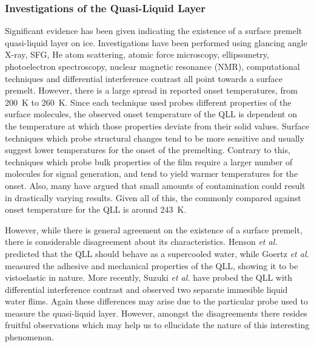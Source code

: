 \subsubsection{Investigations of the Quasi-Liquid Layer}
Significant evidence has been given indicating the existence of a
surface premelt quasi-liquid layer on ice. Investigations have been
performed using glancing angle X-ray\cite{Lied1994, Dosch1995},
SFG\cite{Wei2001}, He atom scattering\cite{Suter2006}, atomic force
microscopy\cite{Goertz2009,Doppenschmidt2000},
ellipsometry\cite{Furukawa1997}, photoelectron
spectroscopy\cite{Bluhm2002}, nuclear magnetic resonance
(NMR)\cite{Dec2009,Dec2012}, computational
techniques\cite{Conde2008,Neshyba2009,Gladich2011,Pfalzgraff2011,Gladich2015,Park2010,Shepherd2012,Limmer2014,Persson2015}
and differential interference
contrast\cite{Sazaki2012,Asakawa2016,Sazaki2013} all point towards a
surface premelt. However, there is a large spread in reported onset
temperatures, from 200~K to 260~K. Since each technique used probes
different properties of the surface molecules, the observed onset
temperature of the QLL is dependent on the temperature at which those
properties deviate from their solid values. Surface techniques which
probe structural changes tend to be more sensitive and usually suggest
lower temperatures for the onset of the premelting. Contrary to this,
techniques which probe bulk properties of the film require a larger
number of molecules for signal generation, and tend to yield warmer
temperatures for the onset. Also, many have argued that small amounts
of contamination could result in drastically varying
results.\cite{Elbaum1993,Wettlaufer1999} Given all of this, the
commonly compared against onset temperature for the QLL is around
243~K.

However, while there is general agreement on the existence of a
surface premelt, there is considerable disagreement about its
characteristics. Henson \textit{et al.} predicted that the QLL should
behave as a supercooled water\cite{Henson2005}, while Goertz
\textit{et al.}  measured the adhesive and mechanical properties of
the QLL, showing it to be vistoelastic in nature.\cite{Goertz2009}
More recently, Suzuki \textit{et al.}  have probed the QLL with
differential interference contrast and observed two separate immesible
liquid water flims.\cite{Sazaki2012,Asakawa2016,Sazaki2013} Again
these differences may arise due to the particular probe used to
measure the quasi-liquid layer. However, amongst the disagreements
there resides fruitful observations which may help us to ellucidate
the nature of this interesting phenomenon. 


